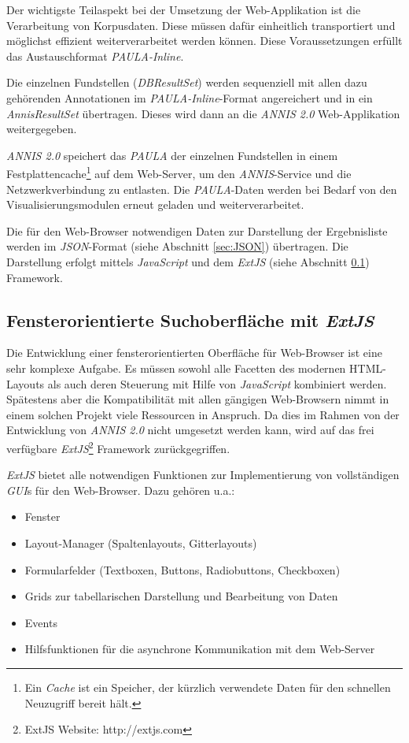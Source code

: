 Der wichtigste Teilaspekt bei der Umsetzung der Web-Applikation ist die Verarbeitung von Korpusdaten. Diese müssen dafür einheitlich transportiert und möglichst effizient weiterverarbeitet werden können. Diese Voraussetzungen erfüllt das Austauschformat \emph{PAULA-Inline}.

Die einzelnen Fundstellen (\emph{DBResultSet}) werden sequenziell mit allen dazu gehörenden Annotationen im \emph{PAULA-Inline}-Format angereichert und in ein \emph{AnnisResultSet} übertragen. Dieses wird dann an die \emph{ANNIS 2.0} Web-Applikation weitergegeben.

\emph{ANNIS 2.0} speichert das \emph{PAULA} der einzelnen Fundstellen in einem Festplattencache\footnote{Ein \emph{Cache} ist ein Speicher, der kürzlich verwendete Daten für den schnellen Neuzugriff bereit hält.} auf dem Web-Server, um den \emph{ANNIS}-Service und die Netzwerkverbindung zu entlasten. Die \emph{PAULA}-Daten werden bei Bedarf von den Visualisierungsmodulen erneut geladen und weiterverarbeitet.

Die für den Web-Browser notwendigen Daten zur Darstellung der Ergebnisliste werden im \emph{JSON}-Format (siehe Abschnitt \ref{sec:JSON}) übertragen. Die Darstellung erfolgt mittels \emph{JavaScript} und dem \emph{ExtJS} (siehe Abschnitt \ref{sec:ExtJS}) Framework.


\newpage
\subsection{Fensterorientierte Suchoberfläche mit \emph{ExtJS}}\label{sec:ExtJS}

Die Entwicklung einer fensterorientierten Oberfläche für Web-Browser ist eine sehr komplexe Aufgabe. Es müssen sowohl alle Facetten des modernen HTML-Layouts als auch deren Steuerung mit Hilfe von \emph{JavaScript} kombiniert werden. Spätestens aber die Kompatibilität mit allen gängigen Web-Browsern nimmt in einem solchen Projekt viele Ressourcen in Anspruch. Da dies im Rahmen von der Entwicklung von \emph{ANNIS 2.0} nicht umgesetzt werden kann, wird auf das frei verfügbare \emph{ExtJS}\footnote{ExtJS Website: http://extjs.com} Framework zurückgegriffen.

\emph{ExtJS} bietet alle notwendigen Funktionen zur Implementierung von vollständigen \emph{GUI}s für den Web-Browser. Dazu gehören u.a.:

\begin{itemize}
	\item{Fenster}
	\item{Layout-Manager (Spaltenlayouts, Gitterlayouts)}
	\item{Formularfelder (Textboxen, Buttons, Radiobuttons, Checkboxen)}
	\item{Grids zur tabellarischen Darstellung und Bearbeitung von Daten}
	\item{Events}
	\item{Hilfsfunktionen für die asynchrone Kommunikation mit dem Web-Server}
\end{itemize}

